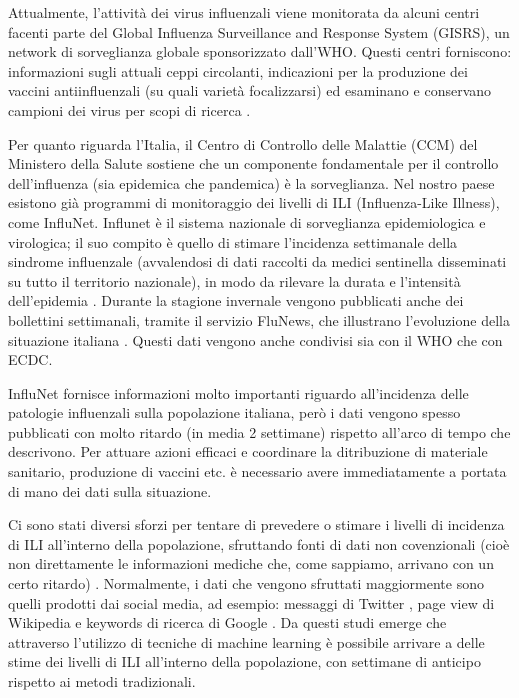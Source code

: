 Attualmente, l'attività dei virus influenzali viene monitorata da alcuni centri facenti
parte del Global Influenza Surveillance and Response System (GISRS), un network di sorveglianza globale
sponsorizzato dall'WHO. Questi centri forniscono: informazioni sugli attuali ceppi circolanti, indicazioni
per la produzione dei vaccini antiinfluenzali (su quali varietà focalizzarsi) ed esaminano e conservano
campioni dei virus per scopi di ricerca \cite{whoinfluenza_surveillance}.
\bigskip

Per quanto riguarda l'Italia, il Centro di Controllo delle Malattie (CCM) del Ministero della Salute sostiene
che un componente fondamentale per il controllo dell'influenza (sia epidemica che pandemica) è la sorveglianza.
Nel nostro paese esistono già programmi di monitoraggio dei livelli di ILI (Influenza-Like Illness), come 
InfluNet. Influnet è il sistema nazionale di sorveglianza epidemiologica e virologica; il suo compito è quello di
stimare l'incidenza settimanale della sindrome influenzale (avvalendosi di dati raccolti da medici sentinella disseminati
su tutto il territorio nazionale), in modo da rilevare la durata e l'intensità dell'epidemia \cite{influnet}. Durante la 
stagione invernale vengono pubblicati anche dei bollettini settimanali, tramite il servizio FluNews, che illustrano 
l'evoluzione della situazione italiana \cite{influnet_bollettini}. Questi dati vengono anche condivisi sia con il WHO che con 
ECDC.
\bigskip

InfluNet fornisce informazioni molto importanti riguardo all'incidenza delle patologie influenzali sulla popolazione
italiana, però i dati vengono spesso pubblicati con molto ritardo (in media 2 settimane) rispetto all'arco di tempo che 
descrivono. Per attuare azioni efficaci e coordinare la ditribuzione di materiale sanitario, produzione di vaccini etc. è 
necessario avere immediatamente a portata di mano dei dati sulla situazione.  
\bigskip

Ci sono stati diversi sforzi per tentare di prevedere o stimare i livelli di incidenza di ILI all'interno della popolazione,
sfruttando fonti di dati non covenzionali (cioè non direttamente le informazioni mediche che, come sappiamo, arrivano con un 
certo ritardo) \cite{McIver2014, Hickmann2015, googleflutrends, Signorini2011}. Normalmente, i dati che vengono sfruttati 
maggiormente sono quelli prodotti dai social media, ad esempio: messaggi di Twitter \cite{Signorini2011}, page view di 
Wikipedia \cite{McIver2014, Hickmann2015} e keywords di ricerca di Google \cite{googleflutrends}. Da questi studi emerge che 
attraverso l'utilizzo di tecniche di machine learning è possibile arrivare a delle stime dei livelli di ILI all'interno della 
popolazione, con settimane di anticipo rispetto ai metodi tradizionali.
\bigskip

